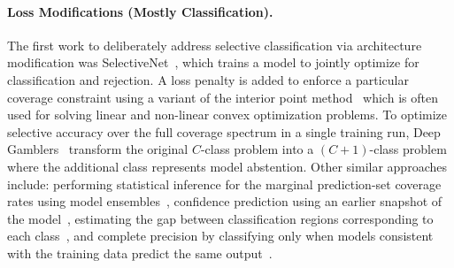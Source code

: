 \paragraph{Loss Modifications (Mostly Classification).} 
The first work to deliberately address selective classification via architecture modification was SelectiveNet~\citep{geifman2019selectivenet}, which trains a model to jointly optimize for classification and rejection. A loss penalty is added to enforce a particular coverage constraint using a variant of the interior point method~\cite{potra2000interior} which is often used for solving linear and non-linear convex optimization problems. To optimize selective accuracy over the full coverage spectrum in a single training run, Deep Gamblers~\citep{liu2019deep} transform the original $C$-class problem into a $(C + 1)$-class problem where the additional class represents model abstention.  
Other similar approaches include: performing statistical inference for the marginal prediction-set coverage rates using model ensembles~\citep{feng2021selective}, confidence prediction using an earlier snapshot of the model~\citep{geifman2018bias}, estimating the gap between classification regions corresponding to each class~\citep{gangrade2021selective}, and complete precision by classifying only when models consistent with the training data predict the same output~\citep{khani2016unanimous}. %


